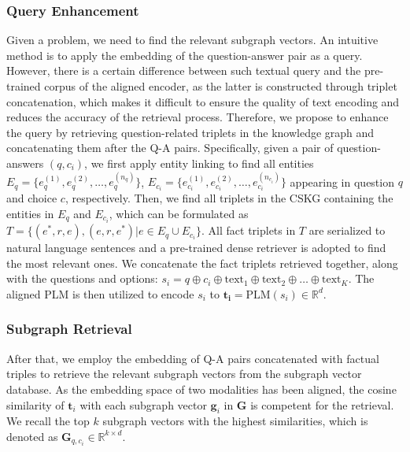 \documentclass[runningheads]{llncs}
\begin{document}
\subsubsection{Query Enhancement}
Given a problem, we need to find the relevant subgraph vectors. An intuitive method is to apply the embedding of the question-answer pair as a query. However, there is a certain difference between such textual query and the pre-trained corpus of the aligned encoder, as the latter is constructed through triplet concatenation, which makes it difficult to ensure the quality of text encoding and reduces the accuracy of the retrieval process. Therefore, we propose to enhance the query by retrieving question-related triplets in the knowledge graph and concatenating them after the Q-A pairs. Specifically, given a pair of question-answers $(q, c_i)$, we first apply entity linking to find all entities $E_q = \{e_q^{(1)},e_q^{(2)},\dots,e_q^{(n_q)}\}$, $E_{c_i} = \{e_{c_i}^{(1)},e_{c_i}^{(2)},\dots,e_{c_i}^{(n_{c_i})}\}$ appearing in question $q$ and choice $c$, respectively. Then, we find all triplets in the CSKG containing the entities in $E_q$ and $E_{c_i}$, which can be formulated as $T = \{(e^*, r, e), (e, r, e^*)|e \in E_q \cup E_{c_i}\}$. All fact triplets in $T$ are serialized to natural language sentences and a pre-trained dense retriever is adopted to find the most relevant ones. We concatenate the fact triplets retrieved together, along with the questions and options: $s_i = q \oplus c_i \oplus \text{text}_1 \oplus \text{text}_2 \oplus \dots \oplus \text{text}_K$. The aligned PLM is then utilized to encode $s_i$ to $\boldsymbol{t_i} = \text{PLM}(s_i) \in \mathbb{R}^d$.


\subsubsection{Subgraph Retrieval}
After that, we employ the embedding of Q-A pairs concatenated with factual triples to retrieve the relevant subgraph vectors from the subgraph vector database. As the embedding space of two modalities has been aligned, the cosine similarity of $\boldsymbol{t}_i$ with each subgraph vector $\boldsymbol{g}_i$ in $\boldsymbol{G}$ is competent for the retrieval. We recall the top $k$ subgraph vectors with the highest similarities, which is denoted as $\boldsymbol{G}_{q, c_i} \in \mathbb{R}^{k \times d}$. 
\end{document}
